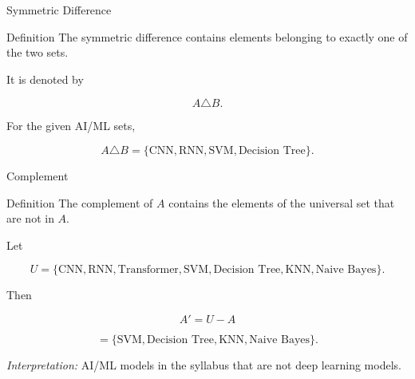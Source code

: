 \documentclass[aspectratio=169]{beamer}
\begin{document}
\begin{frame}{Symmetric Difference}
\begin{block}{Definition}
The symmetric difference contains elements belonging to exactly one of the two sets.
\end{block}

It is denoted by

\[
A\triangle B.
\]

For the given AI/ML sets,

\[
A\triangle B=
\{\text{CNN},
\text{RNN},
\text{SVM},
\text{Decision Tree}\}.
\]
\end{frame}

\begin{frame}{Complement}
\begin{block}{Definition}
The complement of $A$ contains the elements of the universal set that are not in $A$.
\end{block}

Let

\[
U=
\{
\text{CNN},
\text{RNN},
\text{Transformer},
\text{SVM},
\text{Decision Tree},
\text{KNN},
\text{Naive Bayes}
\}.
\]

Then

\[
A'=U-A
\]

\[
=
\{
\text{SVM},
\text{Decision Tree},
\text{KNN},
\text{Naive Bayes}
\}.
\]

\textit{Interpretation:} AI/ML models in the syllabus that are not deep learning models.
\end{frame}
\end{document}
